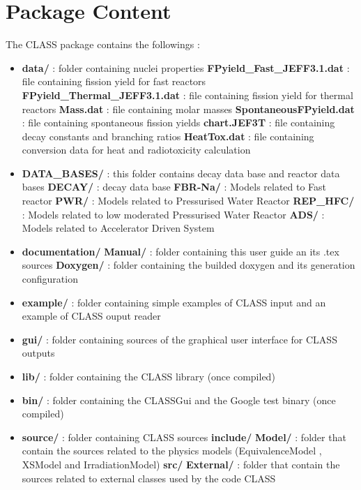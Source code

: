 \chapter{Package Content}
The CLASS package contains the followings :
\begin{itemize}
\item   \textbf{data/} : folder containing nuclei properties
\subitem \textbf{FPyield\_Fast\_JEFF3.1.dat }     : file containing fission yield for fast reactors
\subitem \textbf{FPyield\_Thermal\_JEFF3.1.dat}   : file containing fission yield for thermal reactors
\subitem \textbf{Mass.dat }                     : file containing molar masses
\subitem \textbf{SpontaneousFPyield.dat }       : file containing spontaneous fission yields
\subitem \textbf{chart.JEF3T}                   : file containing decay constants and branching ratios
\subitem \textbf{HeatTox.dat}                   : file containing conversion data for heat and radiotoxicity calculation

 \item \textbf{DATA\_BASES/}  : this folder contains decay data base and reactor data bases
 \subitem \textbf{DECAY/}     : decay data base
 \subitem \textbf{FBR-Na/}    : Models related to Fast reactor
 \subitem \textbf{PWR/}       : Models related to Pressurised Water Reactor
 \subitem \textbf{REP\_HFC/}   : Models related to low moderated Pressurised Water Reactor 
 \subitem \textbf{ADS/}       : Models related to Accelerator Driven System
 
 \item \textbf{documentation/} 
 \subitem \textbf{Manual/}    : folder containing this user guide an its .tex sources
 \subitem \textbf{Doxygen/}   : folder containing the builded doxygen and its generation configuration 

\item \textbf{example/} : folder containing simple examples of CLASS input and an example of CLASS ouput reader

\item \textbf{gui/} : folder containing sources of the graphical user interface for CLASS outputs
 
\item \textbf{lib/} : folder containing the CLASS library (once compiled)
\item \textbf{bin/} : folder containing the CLASSGui and the Google test binary (once compiled)

\item \textbf{source/} : folder containing CLASS sources
\subitem \textbf{include/}
\subitem \textbf{Model/} : folder that contain the sources related to the physics models (EquivalenceModel , XSModel and IrradiationModel)
\subitem \textbf{src/}
\subitem \textbf{External/} : folder that contain the sources related to external classes used by the code CLASS


\end{itemize}
